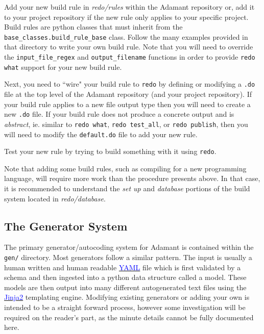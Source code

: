 \vspace{5mm} %
\begin{spacedenumerate}
  \item Add your new build rule in \textit{redo/rules} within the Adamant repository or, add it to your project repository if the new rule only applies to your specific project. Build rules are python classes that must inherit from the \texttt{base\_classes.build\_rule\_base} class. Follow the many examples provided in that directory to write your own build rule. Note that you will need to override the \texttt{input\_file\_regex} and \texttt{output\_filename} functions in order to provide \texttt{redo what} support for your new build rule.
  \item Next, you need to ``wire" your build rule to \texttt{redo} by defining or modifying a \texttt{.do} file at the top level of the Adamant repository (and your project repository). If your build rule applies to a new file output type then you will need to create a new \texttt{.do} file. If your build rule does not produce a concrete output and is \textit{abstract}, ie. similar to \texttt{redo what}, \texttt{redo test\_all}, or \texttt{redo publish}, then you will need to modify the \texttt{default.do} file to add your new rule. 
  \item Test your new rule by trying to build something with it using \texttt{redo}.
\end{spacedenumerate}
\vspace{5mm} %

Note that adding some build rules, such as compiling for a new programming language, will require more work than the procedure presents above. In that case, it is recommended to understand the \textit{set up} and \textit{database} portions of the build system located in \textit{redo/database}.

\subsection{The Generator System} \label{Adding Generators}

The primary generator/autocoding system for Adamant is contained within the \texttt{gen/} directory. Most generators follow a similar pattern. The input is usually a human written and human readable \href{http://yaml.org}{\textcolor{blue}{YAML}} file which is first validated by a schema and then ingested into a python data structure called a model. These models are then output into many different autogenerated text files using the \href{http://jinja.pocoo.org}{\textcolor{blue}{Jinja2}} templating engine. Modifying existing generators or adding your own is intended to be a straight forward process, however some investigation will be required on the reader's part, as the minute details cannot be fully documented here.

